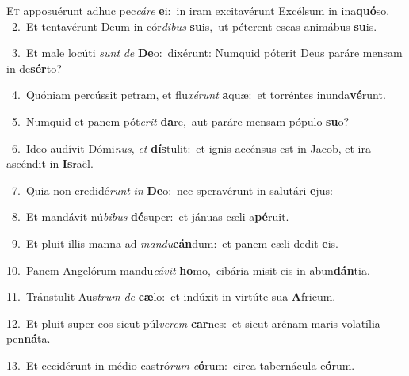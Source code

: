 \lettrine{\initial\textcolor{\initialcolor}{E}}{t} apposuérunt adhuc pec\-\textit{cá}\-\textit{re} \textbf{e}\-i:~\star in iram excitavérunt Excélsum in ina\-\textbf{quó}\-so.\\
{\numbfont\textcolor{\numbcolor}{~2.}}~Et tentavérunt Deum in cór\-\textit{di}\-\textit{bus} \textbf{su}\-is,~\star ut péterent escas animábus \textbf{su}\-is.\par
{\numbfont\textcolor{\numbcolor}{~3.}}~Et male locúti \textit{sunt} \textit{de} \textbf{De}\-o:~\star dixérunt: Numquid póterit Deus paráre mensam in de\-\textbf{sér}\-to?\par
{\numbfont\textcolor{\numbcolor}{~4.}}~Quóniam percússit petram, et flu\-\textit{xé}\-\textit{runt} \textbf{a}\-quæ:~\star et torréntes inunda\-\textbf{vé}\-runt.\par
{\numbfont\textcolor{\numbcolor}{~5.}}~Numquid et panem pót\-\textit{e}\-\textit{rit} \textbf{da}\-re,~\star aut paráre mensam pópulo \textbf{su}\-o?\par
{\numbfont\textcolor{\numbcolor}{~6.}}~Ideo audívit Dómi\-\textit{nus}\-, \textit{et} \textbf{dís}\-tulit:~\star et ignis accénsus est in Jacob, et ira ascéndit in \textbf{Is}\-raël.\par
{\numbfont\textcolor{\numbcolor}{~7.}}~Quia non credidé\textit{runt} \textit{in} \textbf{De}\-o:~\star nec speravérunt in salutári \textbf{e}\-jus:\par
{\numbfont\textcolor{\numbcolor}{~8.}}~Et mandávit nú\-\textit{bi}\-\textit{bus} \textbf{dé}\-super:~\star et jánuas cæli a\-\textbf{pé}\-ruit.\par
{\numbfont\textcolor{\numbcolor}{~9.}}~Et pluit illis manna ad \textit{man}\-\textit{du}\textbf{cán}dum:~\star et panem cæli dedit \textbf{e}\-is.\par
{\numbfont\textcolor{\numbcolor}{10.}}~Panem Angelórum mandu\-\textit{cá}\-\textit{vit} \textbf{ho}\-mo,~\star cibária misit eis in abun\-\textbf{dán}\-tia.\par
{\numbfont\textcolor{\numbcolor}{11.}}~Tránstulit Aus\textit{trum} \textit{de} \textbf{cæ}\-lo:~\star et indúxit in virtúte sua \textbf{A}\-fricum.\par
{\numbfont\textcolor{\numbcolor}{12.}}~Et pluit super eos sicut púl\-\textit{ve}\-\textit{rem} \textbf{car}\-nes:~\star et sicut arénam maris volatília pen\-\textbf{ná}\-ta.\par
{\numbfont\textcolor{\numbcolor}{13.}}~Et cecidérunt in médio castró\textit{rum} \textit{e}\-\textbf{ó}rum:~\star circa tabernácula e\-\textbf{ó}\-rum.\par
